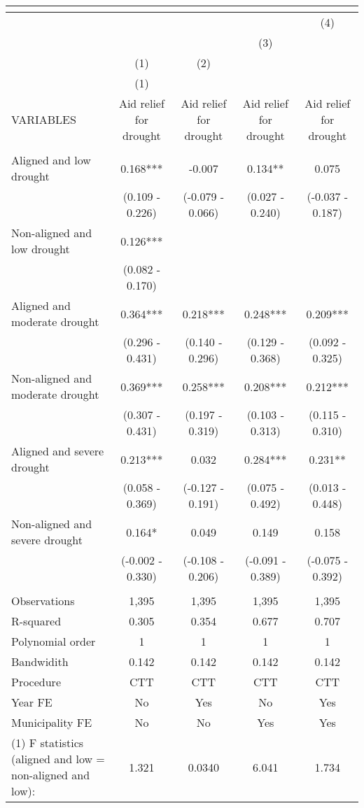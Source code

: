 \begin{tabular}{lcccc}
\multicolumn{5}{c}{} \\ \hline
 &  &  &  & (4) \\
 &  &  & (3) &  \\
 & (1) & (2) &  &  \\
 & (1) &  &  &  \\
VARIABLES & Aid relief for drought & Aid relief for drought & Aid relief for drought & Aid relief for drought \\ \hline
 &  &  &  &  \\
Aligned and low drought & 0.168*** & -0.007 & 0.134** & 0.075 \\
 & (0.109 - 0.226) & (-0.079 - 0.066) & (0.027 - 0.240) & (-0.037 - 0.187) \\
Non-aligned and low drought & 0.126*** &  &  &  \\
 & (0.082 - 0.170) &  &  &  \\
Aligned and moderate drought & 0.364*** & 0.218*** & 0.248*** & 0.209*** \\
 & (0.296 - 0.431) & (0.140 - 0.296) & (0.129 - 0.368) & (0.092 - 0.325) \\
Non-aligned and moderate drought & 0.369*** & 0.258*** & 0.208*** & 0.212*** \\
 & (0.307 - 0.431) & (0.197 - 0.319) & (0.103 - 0.313) & (0.115 - 0.310) \\
Aligned and severe drought & 0.213*** & 0.032 & 0.284*** & 0.231** \\
 & (0.058 - 0.369) & (-0.127 - 0.191) & (0.075 - 0.492) & (0.013 - 0.448) \\
Non-aligned and severe drought & 0.164* & 0.049 & 0.149 & 0.158 \\
 & (-0.002 - 0.330) & (-0.108 - 0.206) & (-0.091 - 0.389) & (-0.075 - 0.392) \\
 &  &  &  &  \\
Observations & 1,395 & 1,395 & 1,395 & 1,395 \\
R-squared & 0.305 & 0.354 & 0.677 & 0.707 \\
Polynomial order & 1 & 1 & 1 & 1 \\
Bandwidith & 0.142 & 0.142 & 0.142 & 0.142 \\
Procedure & CTT & CTT & CTT & CTT \\
Year FE & No & Yes & No & Yes \\
Municipality FE & No & No & Yes & Yes \\
(1) F statistics (aligned and low = non-aligned and low): & 1.321 & 0.0340 & 6.041 & 1.734 \\

\end{tabular}
